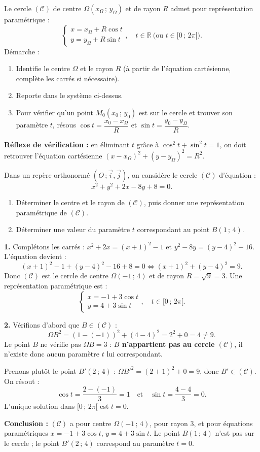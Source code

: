 \documentclass[11pt]{article}
\newcommand{\cle}[1]{{\popxbold\color{popdark}#1}}
\begin{document}
\begin{methode}
Le cercle $(\mathcal{C})$ de centre $\Omega(x_\Omega\,;\,y_\Omega)$ et de rayon $R$ admet pour \cle{représentation paramétrique} :
\[\begin{cases} x=x_\Omega+R\cos t \\ y=y_\Omega+R\sin t \end{cases}, \quad t\in\mathbb{R}\ \text{(ou } t\in[0\,;\,2\pi[\text{)}.\]
Démarche :
\begin{enumerate}
\item Identifie le centre $\Omega$ et le rayon $R$ (à partir de l'équation cartésienne, complète les carrés si nécessaire).
\item Reporte dans le système ci-dessus.
\item Pour vérifier qu'un point $M_0(x_0\,;\,y_0)$ est sur le cercle et trouver son paramètre $t$, résous $\cos t=\dfrac{x_0-x_\Omega}{R}$ et $\sin t=\dfrac{y_0-y_\Omega}{R}$.
\end{enumerate}
\textbf{Réflexe de vérification :} en éliminant $t$ grâce à $\cos^2 t+\sin^2 t=1$, on doit retrouver l'équation cartésienne $(x-x_\Omega)^2+(y-y_\Omega)^2=R^2$.
\end{methode}

\begin{exoresolu}
Dans un repère orthonormé $(O\,;\vec{i},\vec{j})$, on considère le cercle $(\mathcal{C})$ d'équation :
\[x^2+y^2+2x-8y+8=0.\]
\begin{enumerate}
\item Déterminer le centre et le rayon de $(\mathcal{C})$, puis donner une représentation paramétrique de $(\mathcal{C})$.
\item Déterminer une valeur du paramètre $t$ correspondant au point $B(1\,;\,4)$.
\end{enumerate}
\tcblower
\textbf{1.} Complétons les carrés : $x^2+2x=(x+1)^2-1$ et $y^2-8y=(y-4)^2-16$. L'équation devient :
\[(x+1)^2-1+(y-4)^2-16+8=0 \iff (x+1)^2+(y-4)^2=9.\]
Donc $(\mathcal{C})$ est le cercle de centre $\Omega(-1\,;\,4)$ et de rayon $R=\sqrt{9}=3$. Une représentation paramétrique est :
\[\begin{cases} x=-1+3\cos t \\ y=4+3\sin t \end{cases}, \quad t\in[0\,;\,2\pi[.\]

\textbf{2.} Vérifions d'abord que $B\in(\mathcal{C})$ :
\[\Omega B^2=(1-(-1))^2+(4-4)^2=2^2+0=4\neq 9.\]
Le point $B$ ne vérifie pas $\Omega B=3$ : \textbf{$B$ n'appartient pas au cercle $(\mathcal{C})$}, il n'existe donc aucun paramètre $t$ lui correspondant.

Prenons plutôt le point $B'(2\,;\,4)$ : $\Omega B'^2=(2+1)^2+0=9$, donc $B'\in(\mathcal{C})$. On résout :
\[\cos t=\frac{2-(-1)}{3}=1 \quad\text{et}\quad \sin t=\frac{4-4}{3}=0.\]
L'unique solution dans $[0\,;\,2\pi[$ est $t=0$.

\textbf{Conclusion :} $(\mathcal{C})$ a pour centre $\Omega(-1\,;\,4)$, pour rayon $3$, et pour équations paramétriques $x=-1+3\cos t$, $y=4+3\sin t$. Le point $B(1\,;\,4)$ n'est pas sur le cercle ; le point $B'(2\,;\,4)$ correspond au paramètre $t=0$.
\end{exoresolu}
\end{document}
